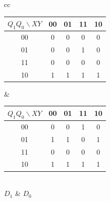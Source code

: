 \begin{figure}[H]
\centering
\begin{tabular}{cc}
\begin{tabular}{c|cccc}
 $Q_1Q_0\backslash XY$ & 00 & 01 & 11 & 10 \\
\hline
00 & 0 & 0 & 0 & 0 \\
01 & 0 & 0 & \cellcolor{kgroupb}1 & 0 \\
11 & 0 & 0 & 0 & 0 \\
10 & \cellcolor{kgroupa}1 & \cellcolor{kgroupa}1 & \cellcolor{kgroupa}1 & \cellcolor{kgroupa}1 \\
\end{tabular}
&
\begin{tabular}{c|cccc}
 $Q_1Q_0\backslash XY$ & 00 & 01 & 11 & 10 \\
\hline
00 & 0 & 0 & 1 & 0 \\
01 & 1 & 1 & 0 & 1 \\
11 & 0 & 0 & 0 & 0 \\
10 & 1 & 1 & 1 & 1 \\
\end{tabular}
\\[4pt]
$D_1$ & $D_0$ \\
\end{tabular}


\end{figure}

